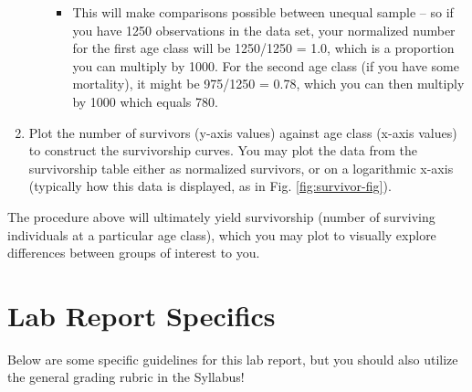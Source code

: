 \documentclass[]{book}
\providecommand{\tightlist}{%
  \setlength{\itemsep}{0pt}\setlength{\parskip}{0pt}}
\theoremstyle{definition}
\theoremstyle{definition}
\theoremstyle{definition}
\theoremstyle{remark}
\begin{document}
\begin{enumerate}
\begin{itemize}
    \begin{itemize}
    \tightlist
    \item
      This will make comparisons possible between unequal sample -- so
      if you have 1250 observations in the data set, your normalized
      number for the first age class will be 1250/1250 = 1.0, which is a
      proportion you can multiply by 1000. For the second age class (if
      you have some mortality), it might be 975/1250 = 0.78, which you
      can then multiply by 1000 which equals 780.
    \end{itemize}
  \end{itemize}
\item
  Plot the number of survivors (y-axis values) against age class (x-axis
  values) to construct the survivorship curves. You may plot the data
  from the survivorship table either as normalized survivors, or on a
  logarithmic x-axis (typically how this data is displayed, as in Fig.
  \ref{fig:survivor-fig}).
\end{enumerate}

The procedure above will ultimately yield survivorship (number of
surviving individuals at a particular age class), which you may plot to
visually explore differences between groups of interest to you.

\pagebreak

\section{Lab Report Specifics}\label{lab-report-specifics}

Below are some specific guidelines for this lab report, but you should
also utilize the general grading rubric in the Syllabus!
\end{document}
